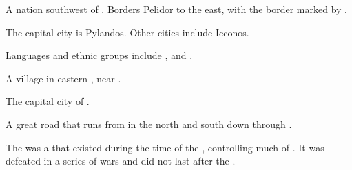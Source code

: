 \begin{gloss}
\begin{subgloss}
  
  
  
  
  
\end{subgloss}







\begin{comment}
\paragraph{\Scyrum}
\end{comment}
\gitem{\Scyrum}
A nation southwest of \Velcad{}. 
Borders Pelidor to the east, with the border marked by . 

The capital city is Pylandos. 
Other cities include Icconos. 

Languages and ethnic groups include \Tepharin, \Samurin{} and \Ortic.  





\begin{subgloss}
  \begin{comment}
  \subparagraph{\Bryndwin}
  \end{comment}
  \gitem{\Bryndwin}
  A village in eastern \Scyrum, near . 

  
  
  
  
  
  \begin{comment}
  \subparagraph{\Pylandos}
  \end{comment}
  \gitem{\Pylandos}
  The capital city of \Scyrum. 

  
  
  
  
  
  \begin{comment}
  \subparagraph{\Pylandos{} Road}
  \end{comment}
  A great road that runs from \Pylandos{} in the north and south down through \Scyrum. 
\end{subgloss}









\begin{comment}
\paragraph{\Shurco}
\end{comment}
\gitem{\Shurco}
\index{\Shurcarie}
The \Shurcarie{} was a \scathaese{}   that existed during the time of the , controlling much of \DurcacContinent. 
It was defeated in a series of wars and did not last after the . 


\end{gloss}
